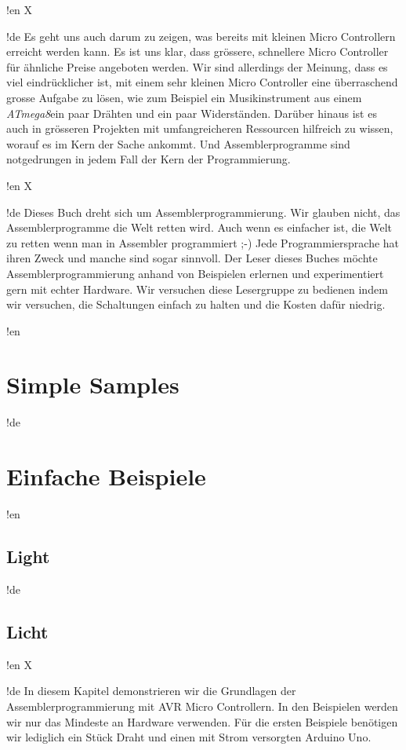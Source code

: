 \documentclass[twoside,12pt,authoryear,openright]{book}
\newcommand{\at}{\textit{ATmega8}}
\begin{document}
!en X

!de Es geht uns auch darum zu zeigen, was bereits mit kleinen Micro Controllern erreicht werden kann. Es ist uns klar, dass grössere, schnellere Micro Controller für ähnliche Preise angeboten werden. Wir sind allerdings der Meinung, dass es viel eindrücklicher ist, mit einem sehr kleinen Micro Controller eine überraschend grosse Aufgabe zu lösen, wie zum Beispiel ein Musikinstrument aus einem \at ein paar Drähten und ein paar Widerständen. Darüber hinaus ist es auch in grösseren Projekten mit umfangreicheren Ressourcen hilfreich zu wissen, worauf es im Kern der Sache ankommt. Und Assemblerprogramme sind notgedrungen in jedem Fall der Kern der Programmierung.



!en X

!de Dieses Buch dreht sich um Assemblerprogrammierung. Wir glauben nicht, das Assemblerprogramme die Welt retten wird. Auch wenn es einfacher ist, die Welt zu retten wenn man in Assembler programmiert ;-) Jede Programmiersprache hat ihren Zweck und manche sind sogar sinnvoll. Der Leser dieses Buches möchte Assemblerprogrammierung anhand von Beispielen erlernen und experimentiert gern mit echter Hardware. Wir versuchen diese Lesergruppe zu bedienen indem wir versuchen, die Schaltungen einfach zu halten und die Kosten dafür niedrig.

\tableofcontents{}
\listoffigures{}
\listoftables{}


!en \part{Simple Samples}
!de \part{Einfache Beispiele}


!en \chapter{Light}
!de \chapter{Licht}



!en X

!de In diesem Kapitel demonstrieren wir die Grundlagen der Assemblerprogrammierung mit AVR Micro Controllern. In den Beispielen werden wir nur das Mindeste an Hardware verwenden. Für die ersten Beispiele benötigen wir lediglich ein Stück Draht und einen mit Strom versorgten Arduino Uno.
\end{document}
